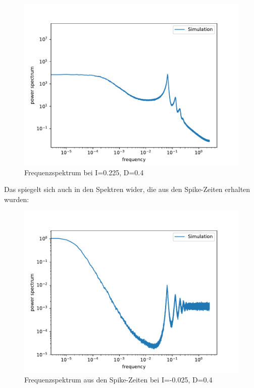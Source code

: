 \documentclass[12pt,a4paper]{article}
\begin{document}
\begin{figure}[H]
	\centering
	\includegraphics[scale=0.9]{inapikrealfast3jjem34017.pdf}
	\caption{Frequenzspektrum bei I=0.225, D=0.4}
	\label{sp4017}
\end{figure}
Das spiegelt sich auch in den Spektren wider, die aus den Spike-Zeiten erhalten wurden:
\begin{figure}[H]
	\centering
	\includegraphics[scale=0.9]{inapikrealfast3jjem3407delta.pdf}
	\caption{Frequenzspektrum aus den Spike-Zeiten bei I=-0.025, D=0.4}
	\label{sp407delta}
\end{figure}
\end{document}
